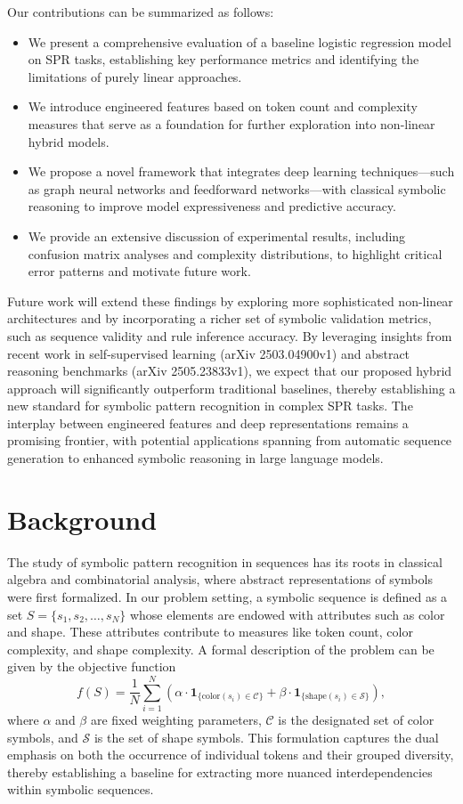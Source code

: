 \documentclass{article}
\begin{document}
Our contributions can be summarized as follows:
\begin{itemize}
    \item We present a comprehensive evaluation of a baseline logistic regression model on SPR tasks, establishing key performance metrics and identifying the limitations of purely linear approaches.
    \item We introduce engineered features based on token count and complexity measures that serve as a foundation for further exploration into non-linear hybrid models.
    \item We propose a novel framework that integrates deep learning techniques—such as graph neural networks and feedforward networks—with classical symbolic reasoning to improve model expressiveness and predictive accuracy.
    \item We provide an extensive discussion of experimental results, including confusion matrix analyses and complexity distributions, to highlight critical error patterns and motivate future work.
\end{itemize}

Future work will extend these findings by exploring more sophisticated non-linear architectures and by incorporating a richer set of symbolic validation metrics, such as sequence validity and rule inference accuracy. By leveraging insights from recent work in self-supervised learning (arXiv 2503.04900v1) and abstract reasoning benchmarks (arXiv 2505.23833v1), we expect that our proposed hybrid approach will significantly outperform traditional baselines, thereby establishing a new standard for symbolic pattern recognition in complex SPR tasks. The interplay between engineered features and deep representations remains a promising frontier, with potential applications spanning from automatic sequence generation to enhanced symbolic reasoning in large language models.

\section{Background}
The study of symbolic pattern recognition in sequences has its roots in classical algebra and combinatorial analysis, where abstract representations of symbols were first formalized. In our problem setting, a symbolic sequence is defined as a set \( S = \{s_1, s_2, \dots, s_N\} \) whose elements are endowed with attributes such as color and shape. These attributes contribute to measures like token count, color complexity, and shape complexity. A formal description of the problem can be given by the objective function 
\[
f(S) = \frac{1}{N} \sum_{i=1}^{N} \left( \alpha \cdot \mathbf{1}_{\{\text{color}(s_i) \in \mathcal{C}\}} + \beta \cdot \mathbf{1}_{\{\text{shape}(s_i) \in \mathcal{S}\}} \right),
\]
where \(\alpha\) and \(\beta\) are fixed weighting parameters, \(\mathcal{C}\) is the designated set of color symbols, and \(\mathcal{S}\) is the set of shape symbols. This formulation captures the dual emphasis on both the occurrence of individual tokens and their grouped diversity, thereby establishing a baseline for extracting more nuanced interdependencies within symbolic sequences.
\end{document}
